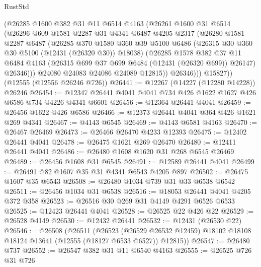 \begin{lexlean}{RustStd}
\begin{coremodule}
            (@26285
              @1600
              @382
              @31
              @11
              @6514
              @4163
              (@26261
                @1600
                @31
                @6514
                (@26296
                  @609
                  @1581
                  @2287
                  @31
                  @4341
                  @6487
                  @4205
                  @2317
                  (@26280
                    @1581
                    @2287
                    @6487
                    (@26285
                      @370
                      @1580
                      @360
                      @39
                      @5100
                      @6486
                      (@26315 @30 @360 @30 @5100 (@12431 (@26320 @30)) @18038)
                      (@26285
                        @1578
                        @382
                        @37
                        @11
                        @6484
                        @4163
                        (@26315 @699 @37 @699 @6484 (@12431 (@26320 @699)) @26147)
                        @26346)))
                  @24080
                  @24083
                  @24086
                  @24089
                  @12815))
              @26346)))
        @15827))
    (@12555 (@12556 @26246 @726))
@26441 := @12267 (@14227 (@12280 @14228)) @26246
@26454 := @12347 @26441 @4041 @4041 @734 @426 @1622 @1627 @426 @6586 @734 @4226 @4341 @6601
@26456 := @12364 @26441 @4041
@26459 := @26456 @1622 @426 @6586
@26466 := @12373 @26441 @4041 @364 @426 @1621 @269 @4341
@26467 := @4143 @6545
@26469 := @4143 @6581 @4163
@26470 := @26467 @26469
@26473 := @26466 @26470 @4233 @12393
@26475 := @12402 @26441 @4041
@26478 := @26475 @1621 @269 @26470
@26480 := @12411 @26441 @4041
@26486 := @26480 @1608 @1620 @31 @268 @6545 @26469
@26489 := @26456 @1608 @31 @6545
@26491 := @12589 @26441 @4041
@26499 := @26491 @82 @1607 @35 @31 @4341 @6543 @4205 @897
@26502 := @26475 @1607 @35 @6543
@26508 := @26480 @1034 @739 @31 @33 @6538 @6542
@26511 := @26456 @1034 @31 @6538
@26516 := @18053 @26441 @4041 @4205 @372 @358
@26523 := @26516 @30 @269 @31 @4149 @4291 @6526 @6533
@26525 := @12423 @26441 @4041
@26528 := @26525 @22 @426 @22
@26529 := @26528 @4149
@26530 := @12432 @26441
@26532 := @12431 (@26530 @22)
@26546 := @26508
    (@26511
      (@26523
        (@26529 @26532 @12459)
        @18102
        @18108
        @18124
        @13641
        (@12555 (@18127 @6533 @6527))
        @12815))
@26547 := @26480 @737
@26552 := @26547 @382 @31 @11 @6540 @4163
@26555 := @26525 @726 @31 @726

\end{coremodule}
\end{lexlean}
